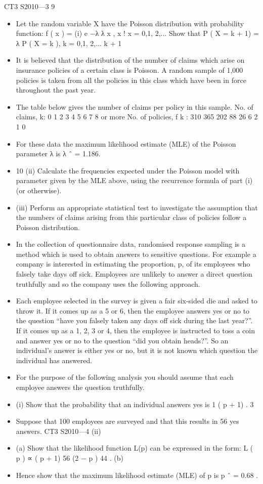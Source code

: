 \documentclass[a4paper,12pt]{article}
\begin{document}
\begin{enumerate}
CT3 S2010—3
9
\begin{itemize}
\item 
Let the random variable X have the Poisson distribution with probability function:
f ( x ) =
(i)
e −λ λ x
,
x !
x = 0,1, 2,...
Show that P ( X = k + 1) =
λ
P ( X = k ), k = 0,1, 2,...
k + 1

\item It is believed that the distribution of the number of claims which arise on insurance
policies of a certain class is Poisson. A random sample of 1,000 policies is taken
from all the policies in this class which have been in force throughout the past year.
\item The table below gives the number of claims per policy in this sample.
No. of claims, k: 0
1
2
3 4 5 6 7 8 or more
No. of policies, f k : 310 365 202 88 26 6 2 1
0
\item For these data the maximum likelihood estimate (MLE) of the Poisson parameter λ is
λ ˆ = 1.186.
\item 
10
(ii) Calculate the frequencies expected under the Poisson model with parameter
given by the MLE above, using the recurrence formula of part (i) (or
otherwise).
\item 
(iii) Perform an appropriate statistical test to investigate the assumption that the
numbers of claims arising from this particular class of policies follow a
Poisson distribution.
\end{itemize}
\newpage
[Total 10]
\begin{itemize}
\item In the collection of questionnaire data, randomised response sampling is a method
which is used to obtain answers to sensitive questions. For example a company is
interested in estimating the proportion, p, of its employees who falsely take days off
sick. Employees are unlikely to answer a direct question truthfully and so the
company uses the following approach.
\item Each employee selected in the survey is given a fair six-sided die and asked to throw
it. If it comes up as a 5 or 6, then the employee answers yes or no to the question
“have you falsely taken any days off sick during the last year?”. If it comes up as a 1,
2, 3 or 4, then the employee is instructed to toss a coin and answer yes or no to the
question “did you obtain heads?”. So an individual’s answer is either yes or no, but it
is not known which question the individual has answered.
\item 
For the purpose of the following analysis you should assume that each employee
answers the question truthfully.
\item 
(i)
Show that the probability that an individual answers yes is
1
( p + 1) .
3
\item Suppose that 100 employees are surveyed and that this results in 56 yes answers.
CT3 S2010—4
(ii)
\item (a)
Show that the likelihood function L(p) can be expressed in the form:
L ( p ) ∝ ( p + 1) 56 (2 − p ) 44 .
(b)
\item Hence show that the maximum likelihood estimate (MLE) of p is
p ˆ = 0.68 .


\end{itemize}
\end{enumerate}
\end{document}
